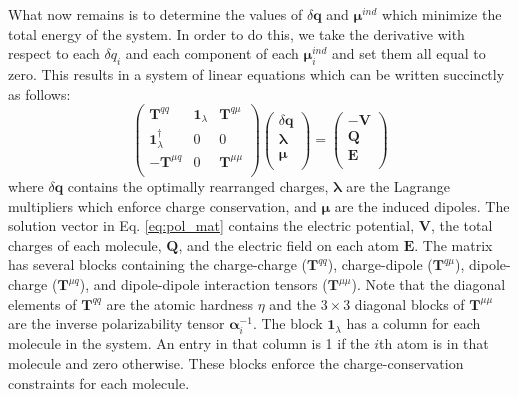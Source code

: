 \documentclass[journal=jctcce,manuscript=article]{achemso}
\begin{document}
What now remains is to determine the values of $\delta \bm{q}$ and $\bm{\mu}^{ind}$
which minimize the total energy of the system. In order to do this, we take
the derivative with respect to each $\delta q_i$ and each component of each
$\bm{\mu}_i^{ind}$ and set them all equal to zero. This results in a system of linear
equations which can be written succinctly as follows:
\begin{equation}
  \begin{pmatrix}
    \bm{T}^{qq} & \bm{1}_\lambda & \bm{T}^{q\mu} \\
    \bm{1}_\lambda^\dagger & 0 & 0 \\
    -\bm{T}^{\mu q} & 0 & \bm{T}^{\mu\mu} \\
  \end{pmatrix}
  \begin{pmatrix}
    \delta \bm{q} \\
    \bm{\lambda} \\
    \bm{\mu} \\
  \end{pmatrix}
  =
  \begin{pmatrix}
    -\bm{V} \\
    \bm{Q} \\
    \bm{E} \\
  \end{pmatrix}
  \label{eq:pol_mat}
\end{equation}
where $\delta\bm{q}$ contains the optimally rearranged charges, $\bm{\lambda}$ are the Lagrange multipliers which enforce charge conservation, and $\bm{\mu}$ are the induced dipoles. The solution vector in Eq. \ref{eq:pol_mat} contains the electric potential, $\bm{V}$, the total charges of each molecule, $\bm{Q}$, and the electric field on each atom $\bm{E}$. The matrix has several blocks containing the charge-charge ($\bm{T}^{qq}$), charge-dipole ($\bm{T}^{q\mu}$), dipole-charge ($\bm{T}^{\mu q}$), and dipole-dipole interaction tensors ($\bm{T}^{\mu\mu}$). Note that the diagonal elements of $\bm{T}^{qq}$ are the atomic hardness $\eta$ and the $3\times 3$ diagonal blocks of $\bm{T}^{\mu\mu}$ are the inverse polarizability tensor $\bm{\alpha}_i^{-1}$. The block $\bm{1}_\lambda$ has a column for each molecule in the system. An entry in that column is 1 if the $i$th atom is in that molecule and zero otherwise. These blocks enforce the charge-conservation constraints for each molecule.
\end{document}
